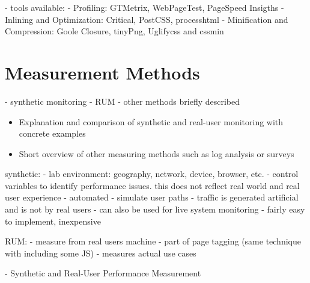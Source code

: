 - tools available:
- Profiling: GTMetrix, WebPageTest, PageSpeed Insigths
- Inlining and Optimization: Critical, PostCSS, processhtml
- Minification and Compression: Goole Closure, tinyPng, Uglifycss and cssmin










\section{Measurement Methods}


- synthetic monitoring
- RUM
- other methods briefly described


\begin{itemize}
\item Explanation and comparison of synthetic and real-user monitoring with concrete examples
\item Short overview of other measuring methods such as log analysis or surveys
\end{itemize}








synthetic:
- lab environment: geography, network, device, browser, etc.
- control variables to identify performance issues. this does not reflect real world and real user experience
- automated
- simulate user paths
- traffic is generated artificial and is not by real users
 - can also be used for live system monitoring
 - fairly easy to implement, inexpensive

RUM:
- measure from real users machine
- part of page tagging (same technique with including some JS)
- measures actual use cases



- Synthetic and Real-User Performance Measurement



